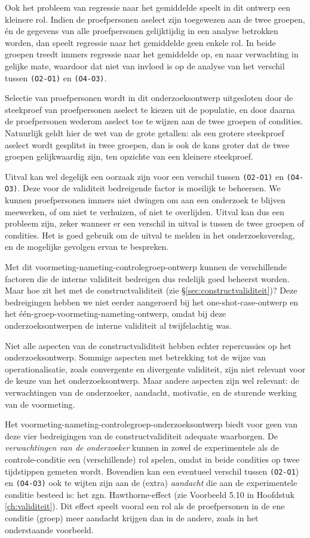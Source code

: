 \documentclass[
]{book}
\begin{document}
Ook het probleem van regressie naar het gemiddelde speelt in dit ontwerp
een kleinere rol. Indien de proefpersonen aselect zijn toegewezen aan de
twee groepen, én de gegevens van alle proefpersonen gelijktijdig in een
analyse betrokken worden, dan speelt regressie naar het gemiddelde geen
enkele rol. In beide groepen treedt immers regressie naar het gemiddelde
op, en naar verwachting in gelijke mate, waardoor dat niet van invloed
is op de analyse van het verschil tussen \texttt{(O2-O1)} en \texttt{(O4-O3)}.

Selectie van proefpersonen wordt in dit onderzoeksontwerp uitgesloten
door de steekproef van proefpersonen aselect te kiezen uit de populatie,
en door daarna de proefpersonen wederom aselect toe te wijzen aan de
twee groepen of condities. Natuurlijk geldt hier de wet van de grote
getallen: als een grotere steekproef aselect wordt gesplitst in twee
groepen, dan is ook de kans groter dat de twee groepen gelijkwaardig
zijn, ten opzichte van een kleinere steekproef.

Uitval kan wel degelijk een oorzaak zijn voor een verschil tussen
\texttt{(O2-O1)} en \texttt{(O4-O3)}. Deze voor de validiteit bedreigende factor
is moeilijk te beheersen. We kunnen proefpersonen immers niet dwingen om
aan een onderzoek te blijven meewerken, of om niet te verhuizen, of niet
te overlijden. Uitval kan dus een probleem zijn, zeker wanneer er een
verschil in uitval is tussen de twee groepen of condities. Het is goed
gebruik om de uitval te melden in het onderzoeksverslag, en de mogelijke
gevolgen ervan te bespreken.

Met dit voormeting-nameting-controlegroep-ontwerp kunnen de
verschillende factoren die de interne validiteit bedreigen dus redelijk
goed beheerst worden. Maar hoe zit het met de constructvaliditeit (zie
§\ref{sec:constructvaliditeit})? Deze bedreigingen hebben we niet
eerder aangeroerd bij het one-shot-case-ontwerp en het
één-groep-voormeting-nameting-ontwerp, omdat bij deze
onderzoeksontwerpen de interne validiteit al twijfelachtig was.

Niet alle aspecten van de constructvaliditeit hebben echter repercussies
op het onderzoeksontwerp. Sommige aspecten met betrekking tot de wijze
van operationalisatie, zoals convergente en divergente validiteit, zijn
niet relevant voor de keuze van het onderzoeksontwerp. Maar andere
aspecten zijn wel relevant: de verwachtingen van de onderzoeker,
aandacht, motivatie, en de sturende werking van de voormeting.

Het voormeting-nameting-controlegroep-onderzoeksontwerp biedt voor geen
van deze vier bedreigingen van de constructvaliditeit adequate
waarborgen. De \emph{verwachtingen van de onderzoeker} kunnen in zowel de
experimentele als de controle-conditie een (verschillende) rol spelen,
omdat in beide condities op twee tijdstippen gemeten wordt. Bovendien
kan een eventueel verschil tussen \texttt{(O2-O1}) en \texttt{(O4-O3)} ook te
wijten zijn aan de (extra) \emph{aandacht} die aan de experimentele conditie
besteed is: het zgn. Hawthorne-effect (zie Voorbeeld 5.10 in Hoofdstuk \ref{ch:validiteit}). Dit effect speelt vooral een rol als de
proefpersonen in de ene conditie (groep) meer aandacht krijgen dan in de
andere, zoals in het onderstaande voorbeeld.
\end{document}

